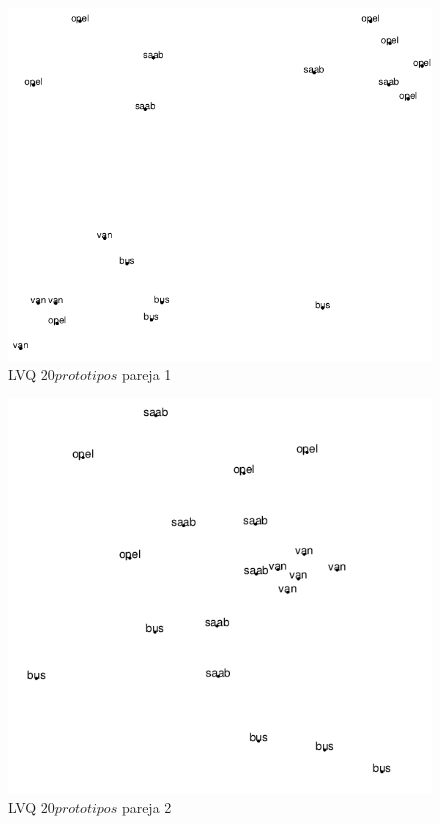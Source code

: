 \documentclass[11pt,spanish,listoffigures,listoftables]{workluis}
\begin{document}
\begin{figure}[H]
\centering
\includegraphics[scale=0.5]{lvq20p1}
\caption{LVQ $20 prototipos$ pareja 1}
\end{figure} 

\begin{figure}[H]
\centering
\includegraphics[scale=0.5]{lvq20p2}
\caption{LVQ $20 prototipos$ pareja 2}
\end{figure} 
\end{document}
